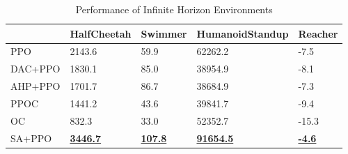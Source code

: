 \begin{table}[]
\caption{Performance of Infinite Horizon Environments}
\label{table:single_infinite}
\vskip 0.15in
\begin{center}
\begin{tabular}{|l|l|l|l|l|}
\hline
        & HalfCheetah        & Swimmer           & HumanoidStandup     & Reacher          \\ \hline
PPO     & 2143.6                & 59.9                 & 62262.2                & -7.5                \\ \hline
DAC+PPO & 1830.1                & 85.0                 & 38954.9                & -8.1                \\ \hline
AHP+PPO & 1701.7                & 86.7                 & 38684.9                & -7.3                \\ \hline
PPOC    & 1441.2                & 43.6                 & 39841.7                & -9.4                \\ \hline
OC      & 832.3                 & 33.0                 & 52352.7                & -15.3               \\ \hline
SA+PPO  & {\ul \textbf{3446.7}} & {\ul \textbf{107.8}} & {\ul \textbf{91654.5}} & {\ul \textbf{-4.6}} \\ \hline
\end{tabular}
\end{center}
\vskip -0.1in
\end{table}

